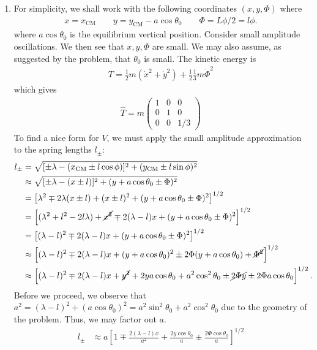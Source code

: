 \documentclass{article}
\theoremstyle{definition}
\newcommand{\f}[2]{\frac{#1}{#2}}
\newcommand{\lb}{\left[}
\newcommand{\rb}{\right]}
\begin{document}
\begin{enumerate}[label=(\alph*)]
	
	\item For simplicity, we shall work with the following coordinates $(x,y,\Phi)$ where 
	\begin{align*}
	x = x_\text{CM} \quad\quad y = y_\text{CM} - a\cos\theta_0 \quad\quad \Phi = L\phi/2 = l\phi.
	\end{align*}
	where $a\cos\theta_0$ is the equilibrium vertical position. Consider small amplitude oscillations. We then see that $x,y,\Phi$ are small.  We may also assume, as suggested by the problem, that $\theta_0$ is small. The kinetic energy is 
	\begin{align*}
	T = \f{1}{2}m (\dot{x}^2 + \dot{y}^2) + \f{1}{2}\f{1}{3}m\dot\Phi^2
	\end{align*}
	which gives
	\begin{align*}
	\boxed{\hat T = m\begin{pmatrix}
	1 & 0 & 0 \\
	0 & 1 & 0 \\
	0 & 0 & 1/3
	\end{pmatrix}}
	\end{align*}
	To find a nice form for $V$, we must apply the small amplitude approximation to the spring lengths $l_\pm$:
	\begin{align*}
	l_\pm  
	&= \sqrt{[\pm \lambda - (x_\text{CM} \pm l\cos\phi)]^2 + (y_\text{CM} \pm l\sin\phi)^2}\\
	&\approx \sqrt{[\pm \lambda - (x \pm l)]^2 + (y + a\cos\theta_0 \pm \Phi)^2}\\
	&= \lb \lambda^2 \mp 2\lambda(x\pm l)+(x\pm l)^2 + (y + a\cos\theta_0\pm \Phi)^2 \rb^{1/2}\\
	&= \lb (\lambda^2 + l^2 - 2l\lambda) + \cancel{x^2} \mp 2(\lambda-l) x + (y + a\cos\theta_0\pm \Phi)^2 \rb^{1/2}\\
	&= \lb (\lambda- l)^2 \mp 2(\lambda-l) x + (y + a\cos\theta_0\pm \Phi)^2 \rb^{1/2}\\
	&\approx \lb (\lambda- l)^2 \mp 2(\lambda-l) x
	+ (y+a\cos\theta_0)^2 \pm 2\Phi(y+a\cos\theta_0) + \cancel{\Phi^2} \rb^{1/2} \\
	&\approx \lb (\lambda- l)^2 \mp 2(\lambda-l) x  + \cancel{y^2} + 2ya\cos\theta_0 +a^2\cos^2\theta_0 \pm \cancel{2\Phi y} \pm 2\Phi a\cos\theta_0  \rb^{1/2}.
	\end{align*}
	Before we proceed, we observe that $a^2 = (\lambda-l)^2 + (a\cos\theta_0)^2 = a^2\sin^2\theta_0 + a^2\cos^2\theta_0 $ due to the geometry of the problem. Thus, we may factor out $a$. 
	\begin{align*}
	l_\pm 
	&\approx a \lb 1 \mp \f{2(\lambda-l) x}{a^2} + \f{2y\cos\theta_0}{a} \pm \f{2\Phi \cos\theta_0}{a} \rb^{1/2}\\

\end{align*}
\end{enumerate}
\end{document}
